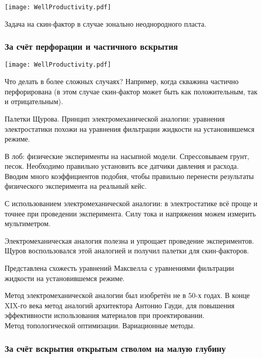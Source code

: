 \documentclass[main.tex]{subfiles}
\begin{document}
\texttt{[image: WellProductivity.pdf]}

Задача на скин-фактор в случае зонально неоднородного пласта.

\subsubsection{За счёт перфорации и частичного вскрытия}

\texttt{[image: WellProductivity.pdf]}

Что делать в более сложных случаях? Например, когда скважина частично перфорирована (в этом случае скин-фактор может быть как положительным, так и отрицательным).

Палетки Щурова. Принцип электромеханической аналогии: уравнения электростатики похожи на уравнения фильтрации жидкости на установившемся режиме.

В лоб: физические эксперименты на насыпной модели. Спрессовываем грунт, песок. Необходимо правильно установить все датчики давления и расхода. Вводим много коэффициентов подобия, чтобы правильно перенести результаты физического эксперимента на реальный кейс.

С использованием электромеханической аналогии: в электростатике всё проще и точнее при проведении эксперимента. Силу тока и напряжения можем измерить мультиметром.

Электромеханическая аналогия полезна и упрощает проведение экспериментов. Щуров воспользовался этой аналогией и получил палетки для скин-факторов.


Представлена схожесть уравнений Максвелла с уравнениями фильтрации жидкости на установившемся режиме.


Метод электромеханической аналогии был изобретён не в 50-х годах. В конце XIX-го века метод аналогий архитектора Антонио Гауди, для повышения эффективности использования материалов при проектировании.\\

Метод топологической оптимизации. Вариационные методы.

\subsubsection{За счёт вскрытия открытым стволом на малую глубину}
\end{document}
